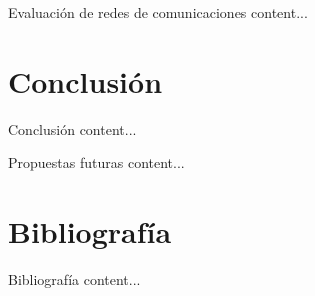 \documentclass[aspectratio=169,xcolor=dvipsnames]{beamer}
\begin{document}
	\begin{frame}{Evaluación de redes de comunicaciones}
		content...
	\end{frame}

	
	\section{Conclusión}
	
	\begin{frame}{Conclusión}
		content...
	\end{frame}

	\begin{frame}{Propuestas futuras}
		content...
	\end{frame}

	
	\section{Bibliografía}
	
	\begin{frame}{Bibliografía}
		content...
	\end{frame}
	
\end{document}
